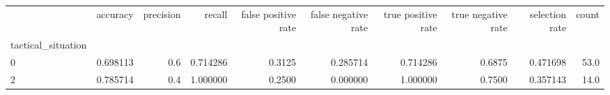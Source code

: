 \begin{tabular}{lrrrrrrrrr}
\toprule
{} &  accuracy &  precision &    recall &  false positive rate &  false negative rate &  true positive rate &  true negative rate &  selection rate &  count \\
tactical\_situation &           &            &           &                      &                      &                     &                     &                 &        \\
\midrule
0                  &  0.698113 &        0.6 &  0.714286 &               0.3125 &             0.285714 &            0.714286 &              0.6875 &        0.471698 &   53.0 \\
2                  &  0.785714 &        0.4 &  1.000000 &               0.2500 &             0.000000 &            1.000000 &              0.7500 &        0.357143 &   14.0 \\
\bottomrule
\end{tabular}

